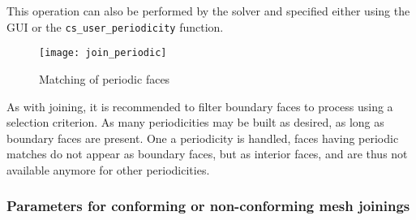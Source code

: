 {{{This operation can also be performed by the solver and specified
either using the GUI or the \texttt{cs\_user\_periodicity} function.

\begin{figure}[!hp]
\centerline{
\texttt{[image: join\_periodic]}}
\caption{Matching of periodic faces
\label{fig_join_periodic}}
\end{figure}

As with joining, it is recommended to filter boundary faces to process
using a selection criterion. As many periodicities may be built as desired,
as long as boundary faces are present. One a periodicity is handled,
faces having periodic matches do not appear as boundary faces, but as
interior faces, and are thus not available anymore for other
periodicities.

\subsubsection{Parameters for conforming or non-conforming mesh joinings}

}}}
